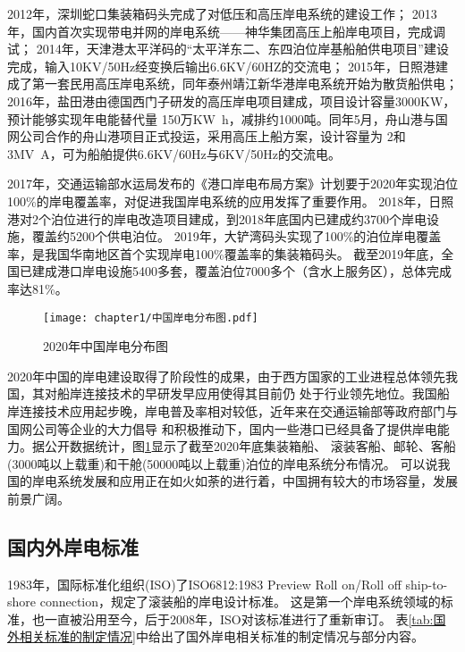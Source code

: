 2012年，深圳蛇口集装箱码头完成了对低压和高压岸电系统的建设工作；
2013年，国内首次实现带电并网的岸电系统——神华集团高压上船岸电项目，完成调试\cite{SP8}；
2014年，天津港太平洋码的“太平洋东二、东四泊位岸基船舶供电项目”建设完成，输入10KV/50Hz经变换后输出6.6KV/60HZ的交流电；
2015年，日照港建成了第一套民用高压岸电系统\cite{SP9}，同年泰州靖江新华港岸电系统开始为散货船供电；
2016年，盐田港由德国西门子研发的高压岸电项目建成，项目设计容量3000KW，预计能够实现年电能替代量
150万\si{KW.h}，减排约1000吨。同年5月，舟山港与国网公司合作的舟山港项目正式投运，采用高压上船方案，设计容量为
2和3\si{MV.A}，可为船舶提供6.6KV/60Hz与6KV/50Hz的交流电\cite{SP10}。

2017年，交通运输部水运局发布的《港口岸电布局方案》计划要于2020年实现泊位100\%的岸电覆盖率，对促进我国岸电系统的应用发挥了重要作用。
2018年，日照港对2个泊位进行的岸电改造项目建成，到2018年底国内已建成约3700个岸电设施，覆盖约5200个供电泊位。
2019年，大铲湾码头实现了100\%的泊位岸电覆盖率，是我国华南地区首个实现岸电100\%覆盖率的集装箱码头\cite{SP11}。
截至2019年底，全国已建成港口岸电设施5400多套，覆盖泊位7000多个（含水上服务区），总体完成率达81\%\cite{SP12}。

\begin{figure}[!htp]
	\centering
	\texttt{[image: chapter1/中国岸电分布图.pdf]}
	\caption{ 2020年中国岸电分布图}
	\label{fig:中国岸电分布图}
\end{figure}

2020年中国的岸电建设取得了阶段性的成果，由于西方国家的工业进程总体领先我国，其对船岸连接技术的早研发早应用使得其目前仍
处于行业领先地位。我国船岸连接技术应用起步晚，岸电普及率相对较低，近年来在交通运输部等政府部门与国网公司等企业的大力倡导
和积极推动下，国内一些港口已经具备了提供岸电能力。据公开数据统计，图\ref{fig:中国岸电分布图}显示了截至2020年底集装箱船、
滚装客船、邮轮、客船(3000吨以上载重)和干舱(50000吨以上载重)泊位的岸电系统分布情况。
可以说我国的岸电系统发展和应用正在如火如荼的进行着，中国拥有较大的市场容量，发展前景广阔。

\subsection{国内外岸电标准}

1983年，国际标准化组织(ISO)了ISO6812:1983 Preview Roll on/Roll off ship-to-shore connection，规定了滚装船的岸电设计标准。
这是第一个岸电系统领域的标准，也一直被沿用至今，后于2008年，ISO对该标准进行了重新审订\cite{SP4}。
表\ref{tab:国外相关标准的制定情况}中给出了国外岸电相关标准的制定情况与部分内容。
\begin{table}[!htp]
	\centering
	\caption[国外相关标准的制定情况]{国外相关标准的制定情况}
	\label{tab:国外相关标准的制定情况}
\end{table}

